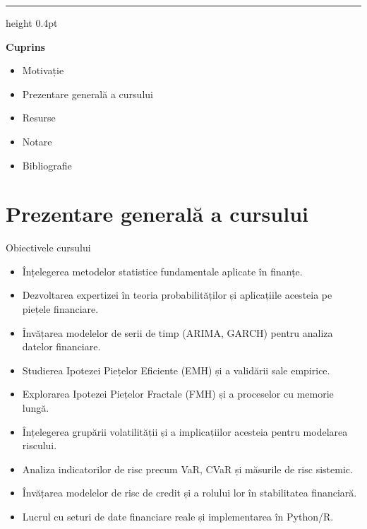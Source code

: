 \documentclass[9pt, aspectratio=169, t]{beamer}
\theoremstyle{definition}
\begin{document}
{
\begin{frame}{}
    {\color{FooterGray}\hrule height 0.4pt}

    \vspace{0.3cm}

    {\Large\textcolor{IDAred}{\textbf{Cuprins}}}

    \vspace{0.4cm}

    \begin{itemize}
        \item Motivație \checkmark
        \item Prezentare generală a cursului
        \item Resurse
        \item Notare
        \item Bibliografie
    \end{itemize}
\end{frame}
}

\section{Prezentare generală a cursului}

\begin{frame}{Obiectivele cursului}
\begin{itemize}
    \item Înțelegerea metodelor statistice fundamentale aplicate în finanțe.
    \item Dezvoltarea expertizei în teoria probabilităților și aplicațiile acesteia pe piețele financiare.
    \item Învățarea modelelor de serii de timp (ARIMA, GARCH) pentru analiza datelor financiare.
    \item Studierea Ipotezei Piețelor Eficiente (EMH) și a validării sale empirice.
    \item Explorarea Ipotezei Piețelor Fractale (FMH) și a proceselor cu memorie lungă.
    \item Înțelegerea grupării volatilității și a implicațiilor acesteia pentru modelarea riscului.
    \item Analiza indicatorilor de risc precum VaR, CVaR și măsurile de risc sistemic.
    \item Învățarea modelelor de risc de credit și a rolului lor în stabilitatea financiară.
    \item Lucrul cu seturi de date financiare reale și implementarea în Python/R.
\end{itemize}
\end{frame}
\end{document}
